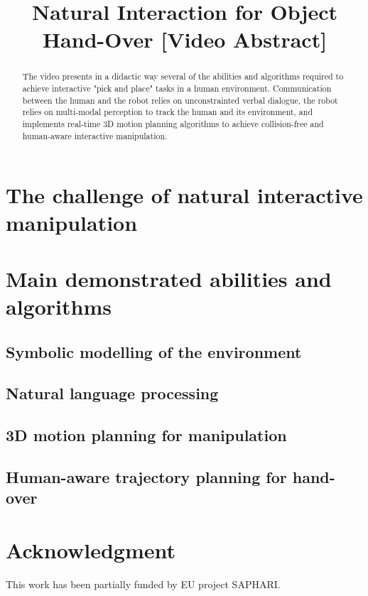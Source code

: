\documentclass[conference]{IEEEtran}
\begin{document}
%
\title{Natural Interaction for Object Hand-Over [Video Abstract]}


\author{
}
\maketitle


\begin{abstract}

The video presents in a didactic way several of the abilities and algorithms
required to achieve interactive "pick and place" tasks in a human environment.
Communication between the human and the robot relies on unconstrainted verbal
dialogue, the robot relies on multi-modal perception to track the human and its
environment, and implements real-time 3D motion planning algorithms to achieve
collision-free and human-aware interactive manipulation.

\end{abstract}


\section{The challenge of natural interactive manipulation}

\section{Main demonstrated abilities and algorithms}

\subsection{Symbolic modelling of the environment}

\subsection{Natural language processing}

\subsection{3D motion planning for manipulation}

\subsection{Human-aware trajectory planning for hand-over}

\section*{Acknowledgment}

This work has been partially funded by EU project SAPHARI.




\end{document}
